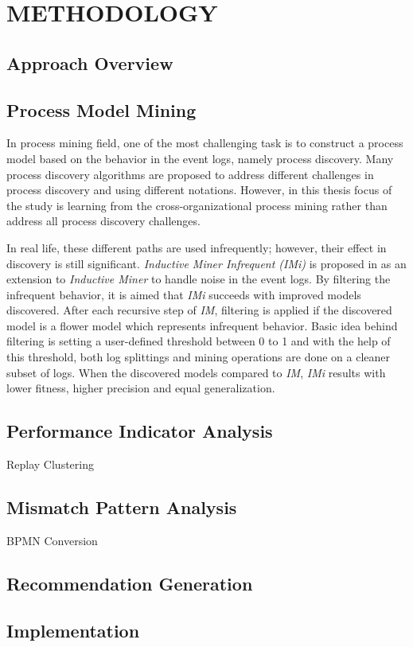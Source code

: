 \chapter{METHODOLOGY}
\label{chp:methodology}


\section{Approach Overview}
\label{sec:approach-overview}

\section{Process Model Mining}
\label{sec:process-model-mining}
In process mining field, one of the most challenging task is to construct a process model based on the behavior in the event logs, namely process discovery. Many process discovery algorithms are proposed to address different challenges in process discovery and using different notations. However, in this thesis focus of the study is learning from the cross-organizational process mining rather than address all process discovery challenges.

 In real life, these different paths are used infrequently; however, their effect in discovery is still significant. \textit{Inductive Miner Infrequent (IMi)} is proposed in \cite{leemans2014discoveringinfrequent} as an extension to \textit{Inductive Miner} to handle noise in the event logs. By filtering the infrequent behavior, it is aimed that \textit{IMi} succeeds with improved models discovered. After each recursive step of \textit{IM}, filtering is applied if the discovered model is a flower model which represents infrequent behavior. Basic idea behind filtering is setting a user-defined threshold between 0 to 1 and with the help of this threshold, both log splittings and mining operations are done on a cleaner subset of logs. When the discovered models compared to \textit{IM}, \textit{IMi} results with lower fitness, higher precision and equal generalization.

 

\section{Performance Indicator Analysis}
\label{sec:performance-indicator-analysis}
	Replay
	Clustering

\section{Mismatch Pattern Analysis}
\label{sec:mismatch-pattern-analysis}
	BPMN Conversion


\section{Recommendation Generation}
\label{sec:recommendation-generation}



\section{Implementation}
\label{sec:implementation}